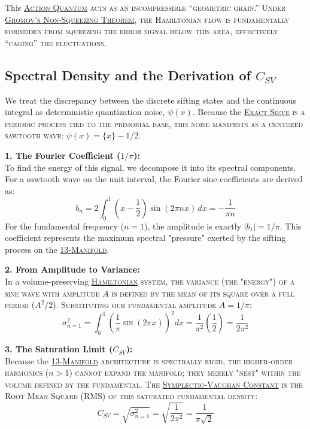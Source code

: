 \documentclass[sn-mathphys-num, pdflatex]{sn-jnl}
\newcommand{\gterm}[2]{\begingroup\normalfont\scshape\hyperlink{#1}{#2}\endgroup}
\begin{document}
This \gterm{action_quantum}{Action Quantum} acts as an incompressible ``geometric grain.'' Under \gterm{gromov}{Gromov's Non-Squeezing Theorem}, the Hamiltonian flow is fundamentally forbidden from squeezing the error signal below this area, effectively ``caging'' the fluctuations.

\subsection{Spectral Density and the Derivation of \texorpdfstring{$C_{SV}$}{C\_SV}}
We treat the discrepancy between the discrete sifting states and the continuous integral as deterministic quantization noise, $\psi(x)$. Because the \gterm{exact_sieve}{Exact Sieve} is a periodic process tied to the primorial base, this noise manifests as a centered sawtooth wave: $\psi(x) = \{x\} - 1/2$.

\textbf{1. The Fourier Coefficient ($1/\pi$):}\\
To find the energy of this signal, we decompose it into its spectral components. For a sawtooth wave on the unit interval, the Fourier sine coefficients are derived as:
\begin{equation}
b_n = 2 \int_{0}^{1} \left( x - \frac{1}{2} \right) \sin(2\pi nx) \, dx = -\frac{1}{\pi n}
\end{equation}
For the fundamental frequency ($n=1$), the amplitude is exactly $|b_1| = 1/\pi$. This coefficient represents the maximum spectral "pressure" exerted by the sifting process on the \gterm{m13}{13-Manifold}.

\textbf{2. From Amplitude to Variance:}\\
In a volume-preserving \gterm{hamiltonian}{Hamiltonian} system, the variance (the "energy") of a sine wave with amplitude $A$ is defined by the mean of its square over a full period ($A^2/2$). Substituting our fundamental amplitude $A = 1/\pi$:
\begin{equation}
\sigma_{n=1}^2 = \int_{0}^{1} \left( \frac{1}{\pi} \sin(2\pi x) \right)^2 dx = \frac{1}{\pi^2} \left( \frac{1}{2} \right) = \frac{1}{2\pi^2}
\end{equation}

\textbf{3. The Saturation Limit ($C_{SV}$):}\\
Because the \gterm{m13}{13-Manifold} architecture is spectrally rigid, the higher-order harmonics ($n > 1$) cannot expand the manifold; they merely "nest" within the volume defined by the fundamental. The \gterm{csv}{Symplectic-Vaughan Constant} is the Root Mean Square (RMS) of this saturated fundamental density:
\begin{equation}
C_{SV} = \sqrt{\sigma_{n=1}^2} = \sqrt{\frac{1}{2\pi^2}} = \frac{1}{\pi\sqrt{2}}
\end{equation}
\end{document}
